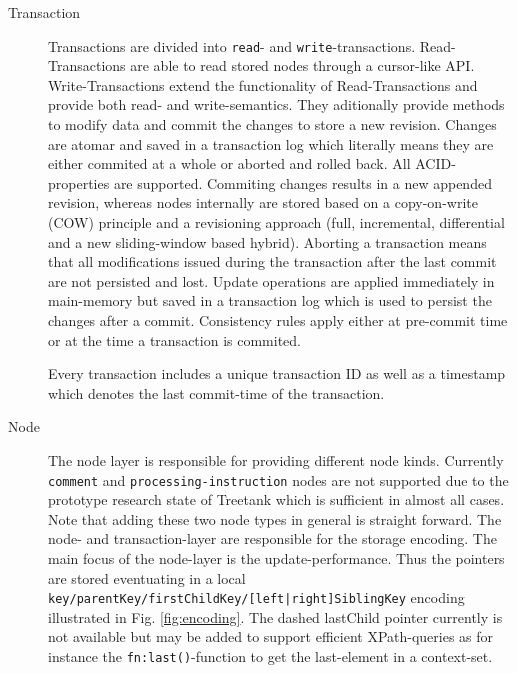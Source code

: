 \begin{description}
\item[Transaction] Transactions are divided into \texttt{read}- and \texttt{write}-transactions. Read-Transactions are able to read stored nodes through a cursor-like API. Write-Transactions extend the functionality of Read-Transactions and provide both read- and write-semantics. They aditionally provide methods to modify data and commit the changes to store a new revision. Changes are atomar and saved in a transaction log which literally means they are either commited at a whole or aborted and rolled back. All ACID-properties are supported. Commiting changes results in a new appended revision, whereas nodes internally are stored based on a copy-on-write (COW) principle and a revisioning approach (full, incremental, differential and a new sliding-window\cite{kramis2009} based hybrid). Aborting a transaction means that all modifications issued during the transaction after the last commit are not persisted and lost. Update operations are applied immediately in main-memory but saved in a transaction log which is used to persist the changes after a commit. Consistency rules apply either at pre-commit time or at the time a transaction is commited.

Every transaction includes a unique transaction ID as well as a timestamp which denotes the last commit-time of the transaction.

\item[Node] The node layer is responsible for providing different node kinds. Currently \texttt{comment} and \texttt{processing-instruction} nodes are not supported due to the prototype research state of Treetank which is sufficient in almost all cases. Note that adding these two node types in general is straight forward. The node- and transaction-layer are responsible for the storage encoding. The main focus of the node-layer is the update-performance. Thus the pointers are stored eventuating in a local \\\texttt{key/parentKey/firstChildKey/[left|right]SiblingKey} encoding illustrated in Fig. \ref{fig:encoding}. The dashed lastChild pointer currently is not available but may be added to support efficient XPath-queries as for instance the \texttt{fn:last()}-function to get the last-element in a context-set. 



\end{description}
